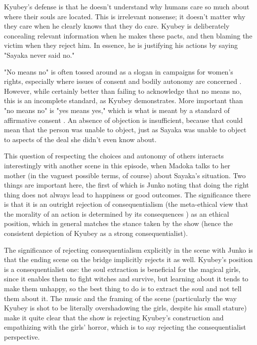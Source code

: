 Kyubey's defense is that he doesn't understand why humans care so much about where their souls are located. This is irrelevant nonsense; it doesn't matter why they care when he clearly knows that they do care. Kyubey is deliberately concealing relevant information when he makes these pacts, and then blaming the victim when they reject him. In essence, he is justifying his actions by saying "Sayaka never said no."

"No means no" is often tossed around as a slogan in campaigns for women's rights, especially where issues of consent and bodily autonomy are concerned \cite{ref47}. However, while certainly better than failing to acknowledge that no means no, this is an incomplete standard, as Kyubey demonstrates. More important than "no means no" is "yes means yes," which is what is meant by a standard of affirmative consent \cite{ref48}. An absence of objection is insufficient, because that could mean that the person was unable to object, just as Sayaka was unable to object to aspects of the deal she didn't even know about.

This question of respecting the choices and autonomy of others interacts interestingly with another scene in this episode, when Madoka talks to her mother (in the vaguest possible terms, of course) about Sayaka's situation. Two things are important here, the first of which is Junko noting that doing the right thing does not always lead to happiness or good outcomes. The significance there is that it is an outright rejection of consequentialism (the meta-ethical view that the morality of an action is determined by its consequences \cite{ref49}) as an ethical position, which in general matches the stance taken by the show (hence the consistent depiction of Kyubey as a strong consequentialist).

The significance of rejecting consequentialism explicitly in the scene with Junko is that the ending scene on the bridge implicitly rejects it as well. Kyubey's position is a consequentialist one: the soul extraction is beneficial for the magical girls, since it enables them to fight witches and survive, but learning about it tends to make them unhappy, so the best thing to do is to extract the soul and not tell them about it. The music and the framing of the scene (particularly the way Kyubey is shot to be literally overshadowing the girls, despite his small stature) make it quite clear that the show is rejecting Kyubey's construction and empathizing with the girls' horror, which is to say rejecting the consequentialist perspective.

